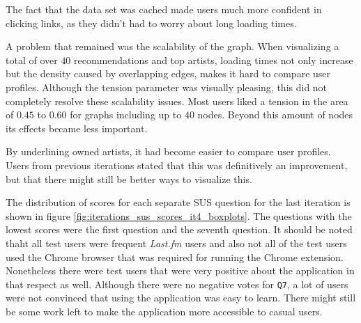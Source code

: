 The fact that the data set was cached made users much more confident in clicking links, as they didn't had to worry about long loading times.

A problem that remained was the scalability of the graph. When visualizing a total of over $40$ recommendations and top artists, loading times not only increase but the density caused by overlapping edges, makes it hard to compare user profiles. Although the tension parameter was visually pleasing, this did not completely resolve these scalability issues. Most users liked a tension in the area of $0.45$ to $0.60$ for graphs including up to $40$ nodes. Beyond this amount of nodes its effects became less important.

By underlining owned artists, it had become easier to compare user profiles. Users from previous iterations stated that this was definitively an improvement, but that there might still be better ways to visualize this. %

The distribution of scores for each separate SUS question for the last iteration is shown in figure \ref{fig:iterations_sus_scores_it4_boxplots}. The questions with the lowest scores were the first question and the seventh question. It should be noted thaht all test users were frequent \emph{Last.fm} users and also not all of the test users used the Chrome browser that was required for running the Chrome extension. Nonetheless there were test users that were very positive about the application in that respect as well. Although there were no negative votes for \texttt{Q7}, a lot of users were not convinced that using the application was easy to learn. There might still be some work left to make the application more accessible to casual users.










